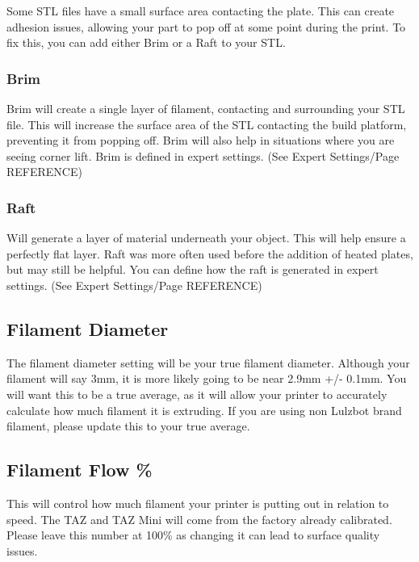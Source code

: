 Some STL files have a small surface area contacting the plate. This can create adhesion issues, allowing your part to pop off at some point during the print. To fix this, you can add either Brim or a Raft to your STL.

\subsubsection{Brim}

Brim will create a single layer of filament, contacting and surrounding your STL file. This will increase the surface area of the STL contacting the build platform, preventing it from popping off. Brim will also help in situations where you are seeing corner lift. Brim is defined in expert settings. (See Expert Settings/Page REFERENCE)

\subsubsection{Raft}

Will generate a layer of material underneath your object. This will help ensure a perfectly flat layer. Raft was more often used before the addition of heated plates, but may still be helpful. You can define how the raft is generated in expert settings. (See Expert Settings/Page REFERENCE)

\subsection{Filament Diameter}

The filament diameter setting will be your true filament diameter. Although your filament will say 3mm, it is more likely going to be near 2.9mm +/- 0.1mm. You will want this 	to be a true average, as it will allow your printer to accurately calculate how much filament it is extruding. If you are using non Lulzbot brand filament, please update this to your true average.

\subsection{Filament Flow \%}

This will control how much filament your printer is putting out in relation to speed. The TAZ and TAZ Mini will come from the factory already calibrated. Please leave this number at 100\% as changing it can lead to surface quality issues.

